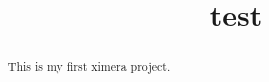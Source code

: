 \documentclass{xourse}
\title{test}
\begin{document}
\begin{abstract}

This is my first ximera project.


\end{abstract}
\maketitle
\end{document}
